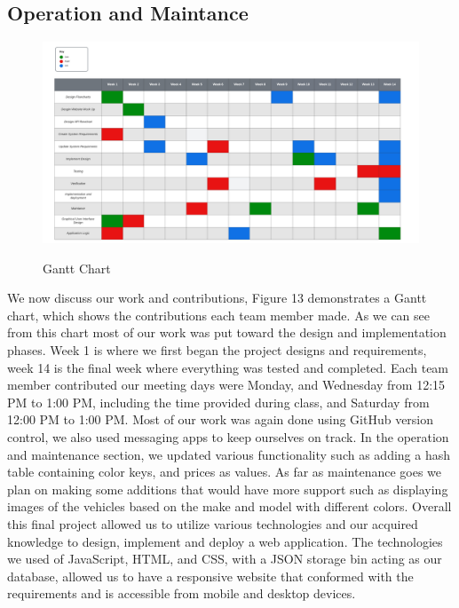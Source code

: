 \documentclass[12pt]{article}
\begin{document}
\subsection{Operation and Maintance}
\begin{figure}[H]
\caption{Gantt Chart}
\centering
\includegraphics[scale=.199]{figures/Gantt Chart.png}\\
\end{figure}
We now discuss our work and contributions, Figure 13  demonstrates a Gantt chart, which shows the contributions each team member made. As we can see from this chart most of our work was put toward the design and implementation phases. Week 1 is where we first began the project designs and requirements, week 14 is the final week where everything was tested and completed. Each team member contributed our meeting days were Monday, and Wednesday from 12:15 PM to 1:00 PM, including the time provided during class, and Saturday from 12:00 PM to 1:00 PM. Most of our work was again done using GitHub version control, we also used messaging apps to keep ourselves on track. In the operation and maintenance section, we updated various functionality such as adding a hash table containing color keys, and prices as values. As far as maintenance goes we plan on making some additions that would have more support such as displaying images of the vehicles based on the make and model with different colors. Overall this final project allowed us to utilize various technologies and our acquired knowledge to design, implement and deploy a web application. The technologies we used of JavaScript, HTML, and CSS, with a JSON storage bin acting as our database, allowed us to have a responsive website that conformed with the requirements and is accessible from mobile and desktop devices. 


\end{document}
